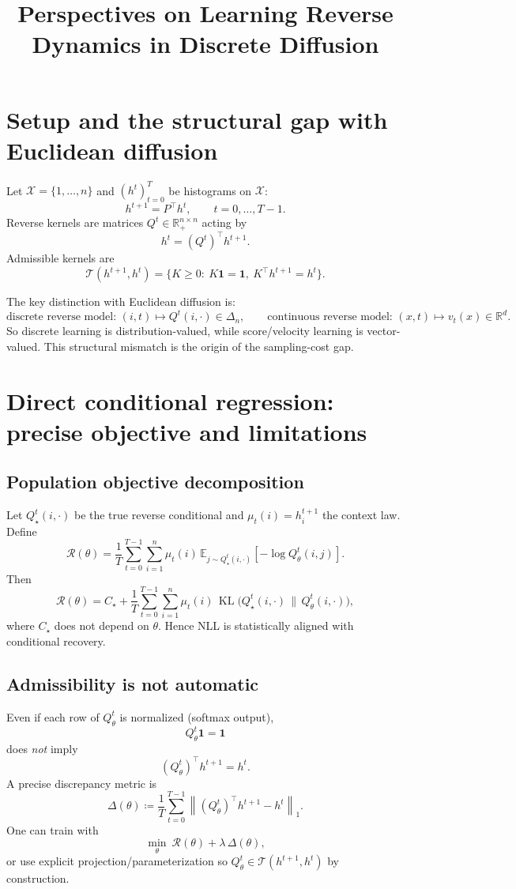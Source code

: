 \documentclass[11pt]{article}
\title{Perspectives on Learning Reverse Dynamics in Discrete Diffusion}
\author{}
\date{}
\newcommand{\ones}{\mathbf{1}}
\newcommand{\KL}{\operatorname{KL}}
\newcommand{\Tset}{\mathcal{T}}
\begin{document}
\maketitle

\section{Setup and the structural gap with Euclidean diffusion}

Let $\mathcal X=\{1,\dots,n\}$ and $(h^t)_{t=0}^T$ be histograms on $\mathcal X$:
\[
h^{t+1}=P^\top h^t,\qquad t=0,\dots,T-1.
\]
Reverse kernels are matrices $Q^t\in\mathbb R_+^{n\times n}$ acting by
\[
h^t=(Q^t)^\top h^{t+1}.
\]
Admissible kernels are
\[
\Tset(h^{t+1},h^t)
=\{K\ge 0:\ K\ones=\ones,\ K^\top h^{t+1}=h^t\}.
\]

The key distinction with Euclidean diffusion is:
\[
\text{discrete reverse model: }(i,t)\mapsto Q^t(i,\cdot)\in\Delta_n,
\qquad
\text{continuous reverse model: }(x,t)\mapsto v_t(x)\in\mathbb R^d.
\]
So discrete learning is distribution-valued, while score/velocity learning is vector-valued. This structural mismatch is the origin of the sampling-cost gap.

\section{Direct conditional regression: precise objective and limitations}

\subsection*{Population objective decomposition}
Let $Q_\star^t(i,\cdot)$ be the true reverse conditional and $\mu_t(i)=h_i^{t+1}$ the context law. Define
\[
\mathcal R(\theta)
=\frac1T\sum_{t=0}^{T-1}\sum_{i=1}^n \mu_t(i)\,
\mathbb E_{j\sim Q_\star^t(i,\cdot)}[-\log Q_\theta^t(i,j)].
\]
Then
\[
\mathcal R(\theta)
=C_\star+\frac1T\sum_{t=0}^{T-1}\sum_{i=1}^n \mu_t(i)\,
\KL\!\big(Q_\star^t(i,\cdot)\,\|\,Q_\theta^t(i,\cdot)\big),
\]
where $C_\star$ does not depend on $\theta$. Hence NLL is statistically aligned with conditional recovery.

\subsection*{Admissibility is not automatic}
Even if each row of $Q_\theta^t$ is normalized (softmax output),
\[
Q_\theta^t\ones=\ones
\]
does \emph{not} imply
\[
(Q_\theta^t)^\top h^{t+1}=h^t.
\]
A precise discrepancy metric is
\[
\Delta(\theta)
\coloneqq
\frac1T\sum_{t=0}^{T-1}
\left\|(Q_\theta^t)^\top h^{t+1}-h^t\right\|_1.
\]
One can train with
\[
\min_\theta\ \mathcal R(\theta)+\lambda\,\Delta(\theta),
\]
or use explicit projection/parameterization so $Q_\theta^t\in\Tset(h^{t+1},h^t)$ by construction.
\end{document}

